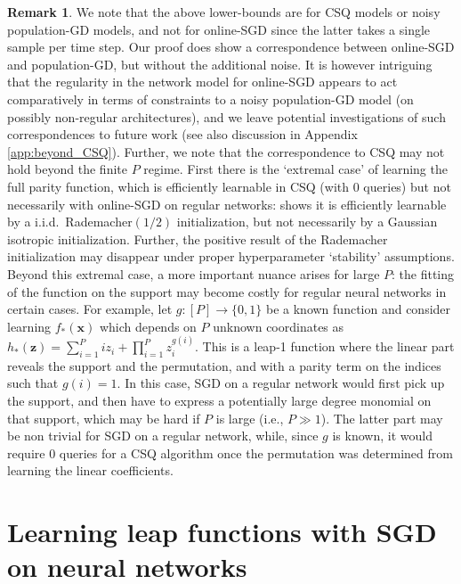 \documentclass[11pt]{article}
\newcommand{\<}{\langle}
\renewcommand{\>}{\rangle}
\theoremstyle{definition}
\newtheorem{remark}{Remark}
\def\bx{{\boldsymbol x}}
\def\bz{{\boldsymbol z}}
\def\bz{{\boldsymbol z}}
\def\bx{{\boldsymbol x}}
\def\bz{{\boldsymbol z}}
\begin{document}
\begin{remark}
We note that the above lower-bounds are for CSQ models or noisy population-GD models, and not for online-SGD since the latter takes a single sample per time step. Our proof does show a correspondence between online-SGD and population-GD, but without the additional noise. It is however intriguing that the regularity in the network model for online-SGD appears to act comparatively in terms of constraints to a noisy population-GD model (on possibly non-regular architectures), and we leave potential investigations of such  correspondences to future work (see also discussion in Appendix \ref{app:beyond_CSQ}). Further, we note that the correspondence to CSQ  may not hold beyond the finite $P$ regime. First there is the `extremal case' of learning the full parity function, which is efficiently learnable in CSQ (with 0 queries) but not necessarily with online-SGD on regular networks: \cite{abbe2022non} shows it is efficiently learnable by a i.i.d.\ Rademacher$(1/2)$ initialization, but not necessarily by a Gaussian isotropic initialization. Further, the positive result of the Rademacher initialization may disappear under proper hyperparameter `stability' assumptions. Beyond this extremal case, a more important nuance arises for large $P$: the fitting of the function on the support may become costly for regular neural networks in certain cases. For example, let $g : [P] \to \{0,1\}$ be a known function and consider learning $f_*(\bx)$ which depends on $P$ unknown coordinates as $h_*(\bz) = \sum_{i =1 }^P i z_i + \prod_{i = 1}^P z_i^{g(i)}$. This is a leap-1 function where the linear part reveals the support and the permutation, and with a parity term on the indices such that $g(i) = 1$. In this case, SGD on a regular network would first pick up 
the support, and then have to express a potentially large degree monomial on that support, which may be hard if $P$ is large (i.e., $P \gg 1$). The latter part may be non trivial for SGD on a regular network, while, since $g$ is known, it would require 0 queries for a CSQ algorithm once the permutation was determined from learning the linear coefficients.    
\end{remark}

\section{Learning leap functions with SGD on neural networks}\label{sec:learning_leap_SGD}
\end{document}

